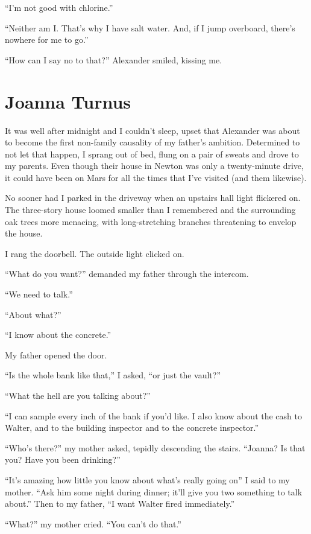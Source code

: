 ``I'm not good with chlorine.''

``Neither am I. That's why I have salt water. And, if I jump overboard,
there's nowhere for me to go.''

``How can I say no to that?'' Alexander smiled, kissing me.

\chapter{Joanna Turnus}

\titlemark

It was well after midnight and I couldn't sleep, upset that Alexander
was about to become the first non-family causality of my father's
ambition. Determined to not let that happen, I sprang out of bed, flung
on a pair of sweats and drove to my parents. Even though their house in
Newton was only a twenty-minute drive, it could have been on Mars for
all the times that I've visited (and them likewise).

No sooner had I parked in the driveway when an upstairs hall light
flickered on. The three-story house loomed smaller than I remembered and
the surrounding oak trees more menacing, with long-stretching branches
threatening to envelop the house.

I rang the doorbell. The outside light clicked on.

``What do you want?'' demanded my father through the intercom.

``We need to talk.''

``About what?''

``I know about the concrete.''

My father opened the door.

``Is the whole bank like that,'' I asked, ``or just the vault?''

``What the hell are you talking about?''

``I can sample every inch of the bank if you'd like. I also know about
the cash to Walter, and to the building inspector and to the concrete
inspector.''

``Who's there?'' my mother asked, tepidly descending the stairs.
``Joanna? Is that you? Have you been drinking?''

``It's amazing how little you know about what's really going on'' I said
to my mother. ``Ask him some night during dinner; it'll give you two
something to talk about.'' Then to my father, ``I want Walter fired
immediately.''

``What?'' my mother cried. ``You can't do that.''


